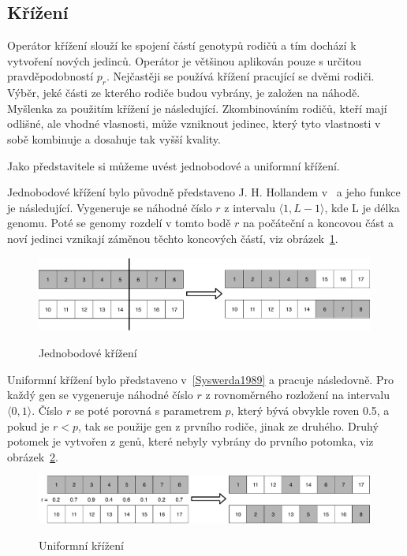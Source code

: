 \subsection{Křížení}
Operátor křížení slouží ke spojení částí genotypů rodičů a tím dochází k vytvoření nových jedinců.
Operátor je většinou aplikován pouze s určitou pravděpodobností $p_r$.
Nejčastěji se používá křížení pracující se dvěmi rodiči.
Výběr, jeké části ze kterého rodiče budou vybrány, je založen na náhodě.
Myšlenka za použitím křížení je následující.
Zkombinováním rodičů, kteří mají odlišné, ale vhodné vlasnosti, může vzniknout jedinec, který tyto vlastnosti v sobě kombinuje a dosahuje tak vyšší kvality.

Jako představitele si můžeme uvést jednobodové a uniformní křížení.

Jednobodové křížení bylo původně představeno J. H. Hollandem v~\cite{Holland1992} a jeho funkce je následující.
Vygeneruje se náhodné číslo $r$ z intervalu $\langle 1, L-1\rangle$, kde L je délka genomu.
Poté se genomy rozdelí v tomto bodě $r$ na počáteční a koncovou část a noví jedinci vznikají záměnou těchto koncových částí, viz obrázek~\ref{fig:jednobodove_krizeni}.

\begin{figure}[h]
    \centering
    {\includegraphics[width=30em]{obrazky/jedobodove_krizeni.pdf}}
    \caption{
    Jednobodové křížení
    }
    \label{fig:jednobodove_krizeni}
\end{figure}

Uniformní křížení bylo představeno v~\ref{Syswerda1989} a pracuje následovně.
Pro každý gen se vygeneruje náhodné číslo $r$ z rovnoměrného rozložení na intervalu $\langle 0, 1\rangle$.
Číslo $r$ se poté porovná s parametrem $p$, který bývá obvykle roven 0.5, a pokud je $r < p$, tak se použije gen z prvního rodiče, jinak ze druhého.
Druhý potomek je vytvořen z genů, které nebyly vybrány do prvního potomka, viz obrázek~\ref{fig:uniformni_krizeni}.

\begin{figure}[h]
    \centering
    {\includegraphics[width=30em]{obrazky/uniformni_krizeni.pdf}}
    \caption{
    Uniformní křížení
    }
    \label{fig:uniformni_krizeni}
\end{figure}



